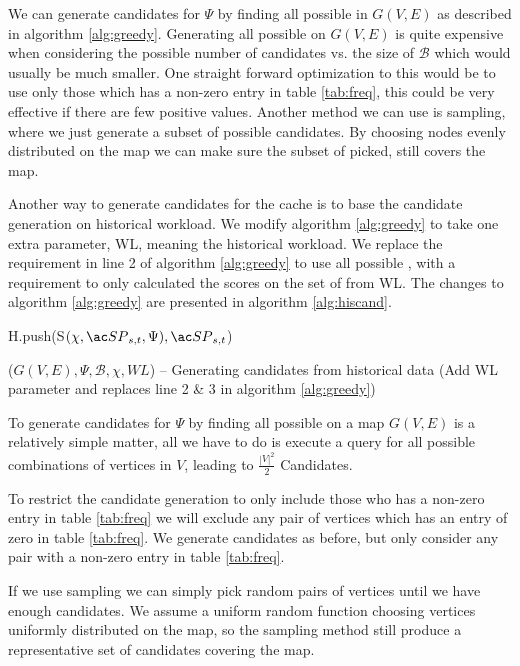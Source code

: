 We can generate candidates for $\Psi$ by finding all possible \spath in $G(V,E)$ as described in algorithm \ref{alg:greedy}. Generating all \spath possible on $G(V,E)$ is quite expensive when considering the possible number of candidates vs. the size of $\mathcal{B}$ which would usually be much smaller. One straight forward optimization to this would be to use only those \spath which has a non-zero entry in table \ref{tab:freq}, this could be very effective if there are few positive values. Another method we can use is sampling, where we just generate a subset of possible candidates. By choosing nodes evenly distributed on the map we can make sure the subset of \spaths picked, still covers the map.

Another way to generate candidates for the cache is to base the candidate generation on historical workload. We modify algorithm \ref{alg:greedy} to take one extra parameter, WL, meaning the historical workload. We replace the requirement in line 2 of algorithm \ref{alg:greedy} to use all possible \spathsns, with a requirement to only calculated the scores on the set of \spaths from WL. The changes to algorithm \ref{alg:greedy} are presented in algorithm \ref{alg:hiscand}.


\begin{algorithm} [H!bt]
\dontprintsemicolon
\SetVline

{
    H.push(S$(\chi, \spath_{s,t}, \Psi), \spath_{s,t}$) \;
}

\caption{\salgons($G(V,E), \Psi, \mathcal{B}, \chi, WL$) -- Generating candidates from historical data (Add WL parameter and replaces line 2 \& 3 in algorithm \ref{alg:greedy})}
\label{alg:hiscand}
\end{algorithm}

To generate \spath candidates for $\Psi$ by finding all possible \spath on a map $G(V,E)$ is a relatively simple matter, all we have to do is execute a \spath query for all possible combinations of vertices in $V$, leading to $\frac{|V|^2}{2}$ Candidates.

To restrict the candidate generation to only include those who has a non-zero entry in table \ref{tab:freq} we will exclude any pair of vertices which has an entry of zero in table \ref{tab:freq}. We generate candidates as before, but only consider any pair with a non-zero entry in table \ref{tab:freq}.

If we use sampling we can simply pick random pairs of vertices until we have enough candidates. We assume a uniform random function choosing vertices uniformly distributed on the map, so the sampling method still produce a representative set of candidates covering the map.

